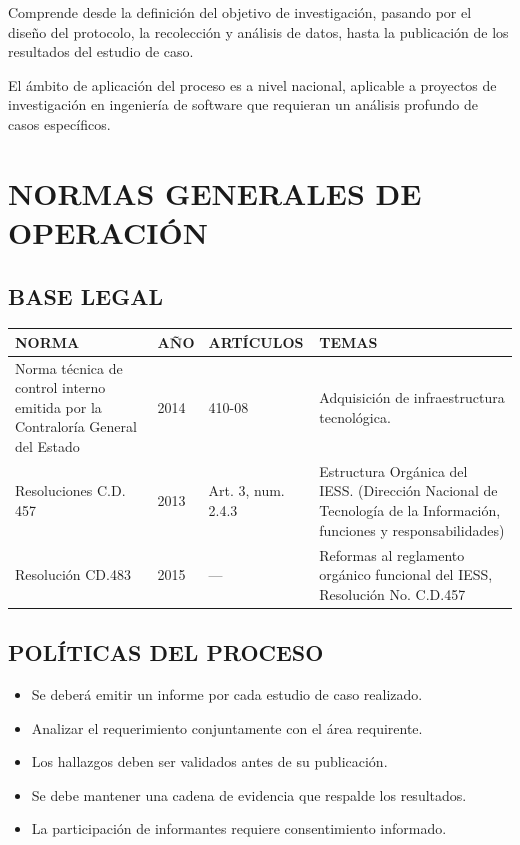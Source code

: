 \documentclass[12pt,a4paper]{article}
\begin{document}
Comprende desde la definición del objetivo de investigación, pasando por el diseño del protocolo, la recolección y análisis de datos, hasta la publicación de los resultados del estudio de caso.

El ámbito de aplicación del proceso es a nivel nacional, aplicable a proyectos de investigación en ingeniería de software que requieran un análisis profundo de casos específicos.

\section{NORMAS GENERALES DE OPERACIÓN}

\subsection{BASE LEGAL}

\begin{longtable}{|L{4cm}|C{1.5cm}|C{2cm}|L{6cm}|}
\hline
\textbf{NORMA} & \textbf{AÑO} & \textbf{ARTÍCULOS} & \textbf{TEMAS} \\
\hline
\endhead
Norma técnica de control interno emitida por la Contraloría General del Estado & 2014 & 410-08 & Adquisición de infraestructura tecnológica. \\
\hline
Resoluciones C.D. 457 & 2013 & Art. 3, num. 2.4.3 & Estructura Orgánica del IESS. (Dirección Nacional de Tecnología de la Información, funciones y responsabilidades) \\
\hline
Resolución CD.483 & 2015 & --- & Reformas al reglamento orgánico funcional del IESS, Resolución No. C.D.457 \\
\hline
\end{longtable}

\subsection{POLÍTICAS DEL PROCESO}

\begin{itemize}[noitemsep]
    \item Se deberá emitir un informe por cada estudio de caso realizado.
    \item Analizar el requerimiento conjuntamente con el área requirente.
    \item Los hallazgos deben ser validados antes de su publicación.
    \item Se debe mantener una cadena de evidencia que respalde los resultados.
    \item La participación de informantes requiere consentimiento informado.
\end{itemize}
\end{document}
